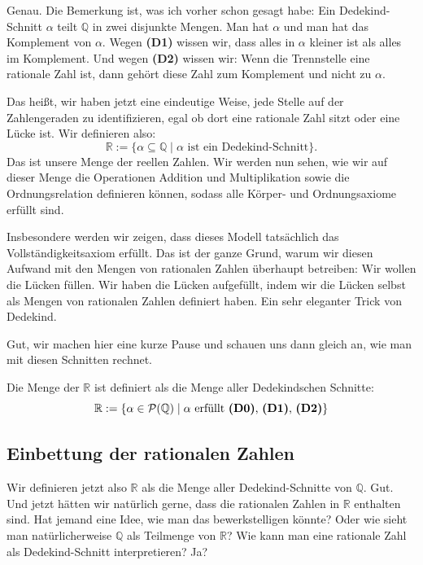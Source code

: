 \begin{spoken-clean}[00:27:30 - 00:29:45]
Genau. Die Bemerkung ist, was ich vorher schon gesagt habe: Ein Dedekind-Schnitt $\alpha$ teilt $\mathbb{Q}$ in zwei disjunkte Mengen. Man hat $\alpha$ und man hat das Komplement von $\alpha$. Wegen \textbf{(D1)} wissen wir, dass alles in $\alpha$ kleiner ist als alles im Komplement. Und wegen \textbf{(D2)} wissen wir: Wenn die Trennstelle eine rationale Zahl ist, dann gehört diese Zahl zum Komplement und nicht zu $\alpha$.

Das heißt, wir haben jetzt eine eindeutige Weise, jede Stelle auf der Zahlengeraden zu identifizieren, egal ob dort eine rationale Zahl sitzt oder eine Lücke ist. Wir definieren also:
\[ \mathbb{R} := \{ \alpha \subseteq \mathbb{Q} \mid \alpha \text{ ist ein Dedekind-Schnitt} \}. \]
Das ist unsere Menge der reellen Zahlen. Wir werden nun sehen, wie wir auf dieser Menge die Operationen Addition und Multiplikation sowie die Ordnungsrelation definieren können, sodass alle Körper- und Ordnungsaxiome erfüllt sind.

Insbesondere werden wir zeigen, dass dieses Modell tatsächlich das Vollständigkeitsaxiom erfüllt. Das ist der ganze Grund, warum wir diesen Aufwand mit den Mengen von rationalen Zahlen überhaupt betreiben: Wir wollen die Lücken füllen. Wir haben die Lücken aufgefüllt, indem wir die Lücken selbst als Mengen von rationalen Zahlen definiert haben. Ein sehr eleganter Trick von Dedekind.

Gut, wir machen hier eine kurze Pause und schauen uns dann gleich an, wie man mit diesen Schnitten rechnet.
\end{spoken-clean}

\begin{math-stroke}
\begin{definition}\label{def:reelle-zahlen}
Die Menge der  $\mathbb{R}$ ist definiert als die Menge aller Dedekindschen Schnitte:
\[ \mathbb{R} := \{ \alpha \in \mathcal{P}(\mathbb{Q}) \mid \alpha \text{ erfüllt \textbf{(D0)}, \textbf{(D1)}, \textbf{(D2)}} \} \]
\end{definition}
\end{math-stroke}

\subsection{Einbettung der rationalen Zahlen}

\begin{spoken-clean}[00:30:50 - 00:33:24]
Wir definieren jetzt also $\mathbb{R}$ als die Menge aller Dedekind-Schnitte von $\mathbb{Q}$. Gut. Und jetzt hätten wir natürlich gerne, dass die rationalen Zahlen in $\mathbb{R}$ enthalten sind. Hat jemand eine Idee, wie man das bewerkstelligen könnte? Oder wie sieht man natürlicherweise $\mathbb{Q}$ als Teilmenge von $\mathbb{R}$? Wie kann man eine rationale Zahl als Dedekind-Schnitt interpretieren? Ja?
\end{spoken-clean}

